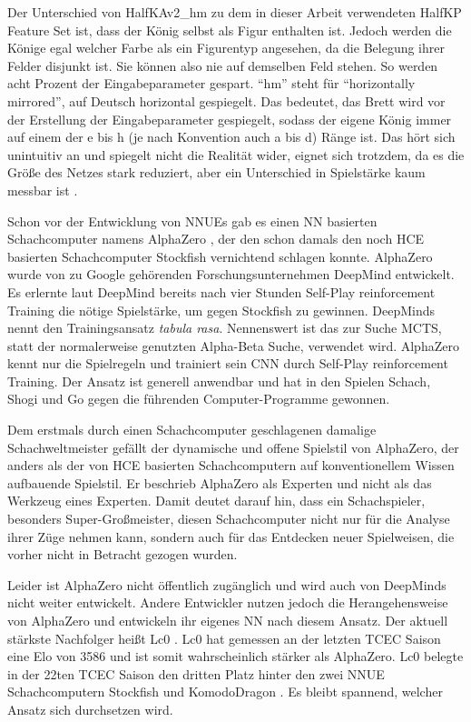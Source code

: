 Der Unterschied von HalfKAv2\_hm zu dem in dieser Arbeit verwendeten HalfKP Feature Set ist, dass der König selbst als Figur enthalten ist. Jedoch werden die Könige egal welcher Farbe als ein Figurentyp angesehen, da die Belegung ihrer Felder disjunkt ist. Sie können also nie auf demselben Feld stehen. So werden acht Prozent der Eingabeparameter gespart. \enquote{hm} steht für \enquote{horizontally mirrored}, auf Deutsch horizontal gespiegelt. Das bedeutet, das Brett wird vor der Erstellung der Eingabeparameter gespiegelt, sodass der eigene König immer auf einem der e bis h (je nach Konvention auch a bis d) Ränge ist. Das hört sich unintuitiv an und spiegelt nicht die Realität wider, eignet sich trotzdem, da es die Größe des Netzes stark reduziert, aber ein Unterschied in Spielstärke kaum messbar ist \cite{StockfishNNUE}.

Schon vor der Entwicklung von \acp{NNUE} gab es einen \ac{NN} basierten Schachcomputer namens AlphaZero \cite{Silver2017}, der den schon damals den noch \ac{HCE} basierten Schachcomputer Stockfish vernichtend schlagen konnte. AlphaZero wurde \citeyear{Silver2017} von zu Google gehörenden Forschungsunternehmen DeepMind entwickelt. Es erlernte laut DeepMind bereits nach vier Stunden Self-Play reinforcement Training die nötige Spielstärke, um gegen Stockfish zu gewinnen. DeepMinds nennt den Trainingsansatz \emph{tabula rasa}. Nennenswert ist das zur Suche \ac{MCTS}, statt der normalerweise genutzten Alpha-Beta Suche, verwendet wird. AlphaZero kennt nur die Spielregeln und trainiert sein \ac{CNN} durch Self-Play reinforcement Training. Der Ansatz ist generell anwendbar und hat in den Spielen Schach, Shogi und Go gegen die führenden Computer-Programme gewonnen.

Dem erstmals durch einen Schachcomputer geschlagenen damalige Schachweltmeister \citeauthor{Kasparov2018} \cite{Kasparov2018} gefällt der dynamische und offene Spielstil von AlphaZero, der anders als der von \ac{HCE} basierten Schachcomputern auf konventionellem Wissen aufbauende Spielstil. Er beschrieb AlphaZero als Experten und nicht als das Werkzeug eines Experten. Damit deutet \citeauthor{Kasparov2018} darauf hin, dass ein Schachspieler, besonders Super-Großmeister, diesen Schachcomputer nicht nur für die Analyse ihrer Züge nehmen kann, sondern auch für das Entdecken neuer Spielweisen, die vorher nicht in Betracht gezogen wurden.

Leider ist AlphaZero nicht öffentlich zugänglich und wird auch von DeepMinds nicht weiter entwickelt. Andere Entwickler nutzen jedoch die Herangehensweise von AlphaZero und entwickeln ihr eigenes \ac{NN} nach diesem Ansatz. Der aktuell stärkste Nachfolger heißt \ac{Lc0} \cite{Lc0Homepage}. \ac{Lc0} hat gemessen an der letzten \ac{TCEC} Saison eine Elo von 3586 \cite{TCEC22} und ist somit wahrscheinlich stärker als AlphaZero. \ac{Lc0} belegte in der 22ten \ac{TCEC} Saison den dritten Platz hinter den zwei \ac{NNUE} Schachcomputern Stockfish und KomodoDragon \cite{KomodoDragon}. Es bleibt spannend, welcher Ansatz sich durchsetzen wird.